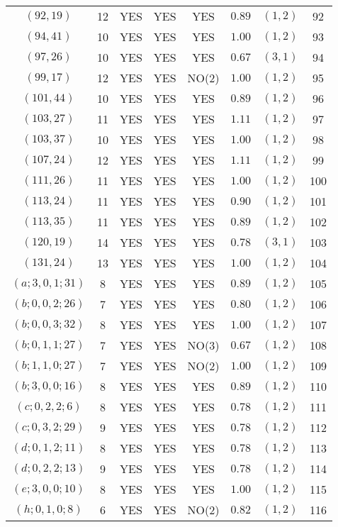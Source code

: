 \begin{longtable}{|c|c|c|c|c|c|c|c|}
$(92,19)$ & 12 & YES & YES & YES & $0.89$ & $(1,2)$ & 92\\
$(94,41)$ & 10 & YES & YES & YES & $1.00$ & $(1,2)$ & 93\\
$(97,26)$ & 10 & YES & YES & YES & $0.67$ & $(3,1)$ & 94\\
$(99,17)$ & 12 & YES & YES & NO(2) & $1.00$ & $(1,2)$ & 95\\
$(101,44)$ & 10 & YES & YES & YES & $0.89$ & $(1,2)$ & 96\\
$(103,27)$ & 11 & YES & YES & YES & $1.11$ & $(1,2)$ & 97\\
$(103,37)$ & 10 & YES & YES & YES & $1.00$ & $(1,2)$ & 98\\
$(107,24)$ & 12 & YES & YES & YES & $1.11$ & $(1,2)$ & 99\\
$(111,26)$ & 11 & YES & YES & YES & $1.00$ & $(1,2)$ & 100\\
$(113,24)$ & 11 & YES & YES & YES & $0.90$ & $(1,2)$ & 101\\
$(113,35)$ & 11 & YES & YES & YES & $0.89$ & $(1,2)$ & 102\\
$(120,19)$ & 14 & YES & YES & YES & $0.78$ & $(3,1)$ & 103\\
$(131,24)$ & 13 & YES & YES & YES & $1.00$ & $(1,2)$ & 104\\
$(a;3,0,1;31)$ & 8 & YES & YES & YES & $0.89$ & $(1,2)$ & 105\\
$(b;0,0,2;26)$ & 7 & YES & YES & YES & $0.80$ & $(1,2)$ & 106\\
$(b;0,0,3;32)$ & 8 & YES & YES & YES & $1.00$ & $(1,2)$ & 107\\
$(b;0,1,1;27)$ & 7 & YES & YES & NO(3) & $0.67$ & $(1,2)$ & 108\\
$(b;1,1,0;27)$ & 7 & YES & YES & NO(2) & $1.00$ & $(1,2)$ & 109\\
$(b;3,0,0;16)$ & 8 & YES & YES & YES & $0.89$ & $(1,2)$ & 110\\
$(c;0,2,2;6)$ & 8 & YES & YES & YES & $0.78$ & $(1,2)$ & 111\\
$(c;0,3,2;29)$ & 9 & YES & YES & YES & $0.78$ & $(1,2)$ & 112\\
$(d;0,1,2;11)$ & 8 & YES & YES & YES & $0.78$ & $(1,2)$ & 113\\
$(d;0,2,2;13)$ & 9 & YES & YES & YES & $0.78$ & $(1,2)$ & 114\\
$(e;3,0,0;10)$ & 8 & YES & YES & YES & $1.00$ & $(1,2)$ & 115\\
$(h;0,1,0;8)$ & 6 & YES & YES & NO(2) & $0.82$ & $(1,2)$ & 116
\end{longtable}
